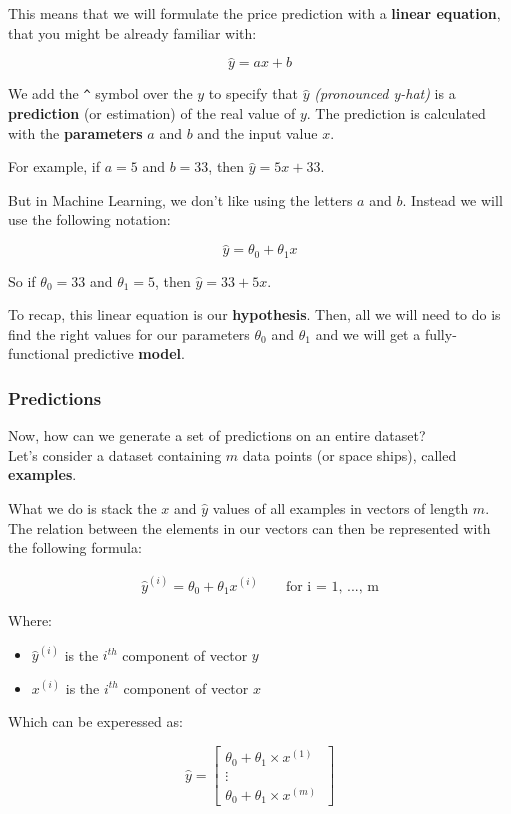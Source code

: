 This means that we will formulate the price prediction with a \textbf{linear equation}, that you might be already familiar with:

$$
\hat{y} = ax + b
$$

We add the \texttt{\^} symbol over the $y$ to specify that $\hat{y}$ \textit{(pronounced y-hat)} is a \textbf{prediction} (or estimation) of the real value of $y$. The prediction is calculated with the \textbf{parameters} $a$ and $b$ and the input value $x$.

For example, if $a = 5$ and $b = 33$, then $\hat{y} = 5x + 33$.

But in Machine Learning, we don't like using the letters $a$ and $b$. Instead we will use the following notation:

$$
\hat{y} = \theta_0 + \theta_1 x
$$

So if $\theta_0 = 33$ and $\theta_1 = 5$, then $\hat{y} = 33+ 5x$.

To recap, this linear equation is our \textbf{hypothesis}. Then, all we will need to do is find the right values for our parameters $\theta_0$ and $\theta_1$ and we will get a fully-functional predictive \textbf{model}.


\subsubsection*{Predictions}
Now, how can we generate a set of predictions on an entire dataset?\\
Let's consider a dataset containing $m$ data points (or space ships), called \textbf{examples}.

What we do is stack the $x$ and $\hat{y}$ values of all examples in vectors of length $m$. The relation between the elements in our vectors can then be represented with the following formula:

$$
\begin{matrix}
\hat{y}^{(i)} = \theta_0 + \theta_1 x^{(i)} & & \text{ for i = 1, ..., m}
\end{matrix}
$$  

Where:
\begin{itemize}
    \item $\hat{y}^{(i)}$ is the $i^{th}$ component of vector $y$
    \item $x^{(i)}$ is the $i^{th}$ component of vector $x$   
\end{itemize}

Which can be experessed as:

$$
\hat{y} = \begin{bmatrix}\theta_0 + \theta_1 \times x^{(1)} \\ \vdots \\  \theta_0 + \theta_1 \times x^{(m)}\ \end{bmatrix}
$$  

